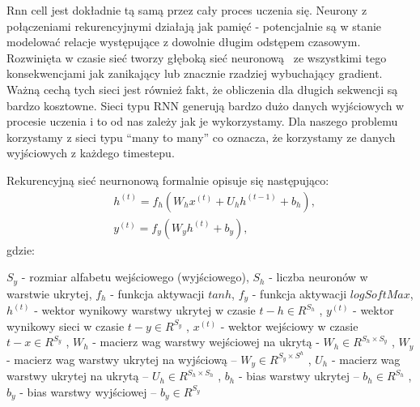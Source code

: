 Rnn cell jest dokładnie tą samą przez cały proces
uczenia się. Neurony z połączeniami rekurencyjnymi działają jak pamięć - potencjalnie są w stanie modelować relacje
występujące z dowolnie długim odstępem czasowym. 
Rozwinięta w czasie sieć tworzy głęboką sieć neuronową 
ze wszystkimi tego konsekwencjami jak zanikający lub znacznie rzadziej wybuchający gradient. 
Ważną cechą tych sieci jest również fakt, że obliczenia dla długich sekwencji są bardzo kosztowne.
Sieci typu RNN generują bardzo dużo danych wyjściowych w procesie uczenia i to od nas zależy jak je 
wykorzystamy. Dla naszego problemu korzystamy z sieci typu ``many to many'' co oznacza, że korzystamy
ze danych wyjściowych z każdego timestepu.

\newpage
Rekurencyjną sieć neurnonową formalnie opisuje się następująco:
\begin{align*}
  &h^{(t)} = f_h(W_hx^{(t)} + U_hh^{(t−1)} + b_h), \\
  &y^{(t)} = f_y(W_yh^{(t)} + b_y),
\end{align*}
gdzie:

$S_y$ - rozmiar alfabetu wejściowego (wyjściowego), \newline
$S_h$ - liczba neuronów w warstwie ukrytej, \newline
$f_h$ - funkcja aktywacji $tanh$, \newline
$f_y$ - funkcja aktywacji $logSoftMax$, \newline
$h^{(t)}$ - wektor wynikowy warstwy ukrytej w czasie $t - h \in R^{S_h}$ , \newline
$y^{(t)}$ - wektor wynikowy sieci w czasie $t - y \in R^{S_y}$ , \newline
$x^{(t)}$ - wektor wejściowy w czasie $t - x \in R^{S_y}$ ,\newline
$W_h$ - macierz wag warstwy wejściowej na ukrytą - $W_h \in R^{{S_h}\times{S_y}}$ , \newline
$W_y$ - macierz wag warstwy ukrytej na wyjściową – $W_y \in R^{{S_y} \times S^h}$ , \newline
$U_h$ - macierz wag warstwy ukrytej na ukrytą  – $U_h \in R^{{S_h} \times S_h}$ ,\newline
$b_h$ - bias warstwy ukrytej – $b_h \in R^{S_h}$ , \newline
$b_y$ - bias warstwy wyjściowej – $b_y \in R^{S_y}$ \newline
